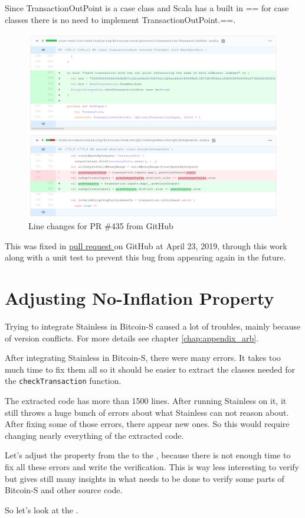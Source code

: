 Since TransactionOutPoint is a case class and Scala has a built in == for case classes there is no need to implement TransactionOutPoint.==.
\begin{figure}[H]
	\centering
		\includegraphics[scale=0.396]{images/bitcoin-s-pr.png}
	\caption{Line changes for PR \#435 from GitHub}
	\label{fig:output1}
\end{figure}

This was fixed in \href{https://github.com/bitcoin-s/bitcoin-s/pull/435}{pull request } on GitHub at April 23, 2019, through this work along with a unit test to prevent this bug from appearing again in the future.


\section{Adjusting No-Inflation Property}


Trying to integrate Stainless in Bitcoin-S caused a lot of troubles, mainly because of version conflicts.
For more details see chapter \ref{chap:appendix_arb}.

After integrating Stainless in Bitcoin-S, there were many errors.
It takes too much time to fix them all so it should be easier to extract the classes needed for the \texttt{checkTransaction} function.

The extracted code has more than 1500 lines.
After running Stainless on it, it still throws a huge bunch of errors about what Stainless can not reason about.
After fixing some of those errors, there appear new ones.
So this would require changing nearly everything of the extracted code.

Let's adjust the property from the  to the , because there is not enough time to fix all these errors and write the verification.
This is way less interesting to verify but gives still many insights in what needs to be done to verify some parts of Bitcoin-S and other source code.

So let's look at the .
